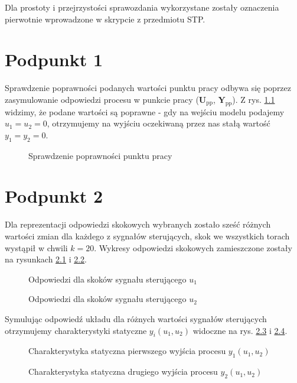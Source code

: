 \bigskip
\bigskip

Dla prostoty i przejrzystości sprawozdania wykorzystane zostały oznaczenia pierwotnie wprowadzone w skrypcie z przedmiotu STP.

\chapter{Podpunkt 1}
Sprawdzenie poprawności podanych wartości punktu pracy odbywa się poprzez zasymulowanie odpowiedzi procesu w punkcie pracy ($\boldsymbol{U}_{\mathrm{pp}}$, $\boldsymbol{Y}_{\mathrm{pp}}$). Z rys. \ref{Z1} widzimy, że podane wartości są poprawne - gdy na wejściu modelu podajemy $u_1=u_2=0$, otrzymujemy na wyjściu oczekiwaną przez nas stałą wartość $y_1=y_2=\num{0}$.

\begin{figure}[ht]
\centering

\caption{Sprawdzenie poprawności punktu pracy}
\label{Z1}
\end{figure}


\chapter{Podpunkt 2}
Dla reprezentacji odpowiedzi skokowych wybranych zostało sześć różnych wartości zmian dla każdego z sygnałów sterujących, skok we wszystkich torach wystąpił w chwili $k=20$. Wykresy odpowiedzi skokowych zamieszczone zostały na rysunkach \ref{Z2U1} i \ref{Z2U2}.

\begin{figure}[ht]
\centering

\caption{Odpowiedzi dla skoków sygnału sterującego $u_1$} 
\label{Z2U1}
\end{figure}

\begin{figure}[ht]
\centering

\caption{Odpowiedzi dla skoków sygnału sterującego $u_2$}
\label{Z2U2}
\end{figure}

Symulując odpowiedź układu dla różnych wartości sygnałów sterujących otrzymujemy charakterystyki statyczne $y_{i}(u_1,u_2)$ widoczne na rys. \ref{Z2Y1stat} i \ref{Z2Y2stat}.

\begin{figure}[ht]
\centering

\caption{Charakterystyka statyczna pierwszego wyjścia procesu $y_1(u_1,u_2)$}
\label{Z2Y1stat}
\end{figure}

\begin{figure}[ht]
\centering

\caption{Charakterystyka statyczna drugiego wyjścia procesu $y_2(u_1,u_2)$}
\label{Z2Y2stat}
\end{figure}

